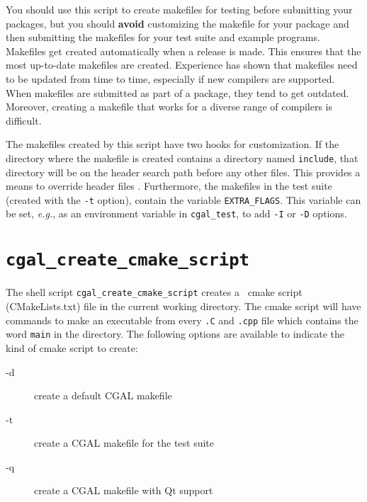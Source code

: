 You should use this script to create makefiles for testing before submitting
your packages, but you should {\bf avoid} customizing the makefile for your
package and then submitting the makefiles for your test suite and example
programs.
Makefiles get created automatically when a release is made. This ensures
that the most up-to-date makefiles are created. Experience has shown
that makefiles need to be updated from time to time, especially if new
compilers are supported. When makefiles are submitted as part of a package,
they tend to get outdated.
Moreover, creating a makefile that works for a diverse range of compilers
is difficult.

The makefiles created by this script have two hooks for customization.
If the directory
where the makefile is created contains a directory named {\tt include},%
that
directory will be on the header search path before any other files. This
provides a means to override header files%
.
Furthermore, the makefiles in the
test suite (created with the {\tt -t} option), contain the variable
{\tt EXTRA\_FLAGS}.%
This variable can be set, {\em e.g.}, as an environment variable in
{\tt cgal\_test}, to add {\tt -I} or {\tt -D} options.

\section{{\tt cgal\_create\_cmake\_script}}
\label{sec:cgal_create_cmake_script}

The shell script
{{\tt cgal\_create\_cmake\_script}} creates a \cgal\ cmake script (CMakeLists.txt) file
in the current working directory.
The cmake script will have commands to make an executable from every {\tt .C}
and {\tt .cpp} file which contains the word {\tt main} in the directory.
The following options are available to indicate the kind of cmake script
to create:
\begin{description}
\item[-d]   create a default CGAL makefile
\item[-t]   create a CGAL makefile for the test suite
\item[-q]   create a CGAL makefile with Qt support
\end{description}


